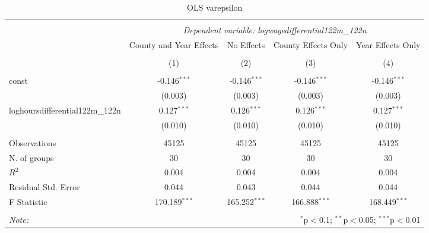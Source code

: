 \documentclass{report}
\begin{document}
\begin{table}[!htbp] \centering
  \caption{OLS varepsilon }
\begin{tabular}{@{\extracolsep{5pt}}lcccc}
\\[-1.8ex]\hline
\hline \\[-1.8ex]
& \multicolumn{4}{c}{\textit{Dependent variable: logwagedifferential122m_122n}} \
\cr \cline{2-5}
\\[-1.8ex] & \multicolumn{1}{c}{County and Year Effects} & \multicolumn{1}{c}{No Effects} & \multicolumn{1}{c}{County Effects Only} & \multicolumn{1}{c}{Year Effects Only}  \\
\\[-1.8ex] & (1) & (2) & (3) & (4) \\
\hline \\[-1.8ex]
 const & -0.146$^{***}$ & -0.146$^{***}$ & -0.146$^{***}$ & -0.146$^{***}$ \\
& (0.003) & (0.003) & (0.003) & (0.003) \\
 loghoursdifferential122m_122n & 0.127$^{***}$ & 0.126$^{***}$ & 0.126$^{***}$ & 0.127$^{***}$ \\
& (0.010) & (0.010) & (0.010) & (0.010) \\
\hline \\[-1.8ex]
 Observations & 45125 & 45125 & 45125 & 45125 \\
 N. of groups & 30 & 30 & 30 & 30 \\
 $R^2$ & 0.004 & 0.004 & 0.004 & 0.004 \\
 Residual Std. Error & 0.044 & 0.043 & 0.044 & 0.044 \\
 F Statistic & 170.189$^{***}$ & 165.252$^{***}$ & 166.888$^{***}$ & 168.449$^{***}$ \\
\hline
\hline \\[-1.8ex]
\textit{Note:} & \multicolumn{4}{r}{$^{*}$p$<$0.1; $^{**}$p$<$0.05; $^{***}$p$<$0.01} \\
\end{tabular}
\end{table}
\end{document}
